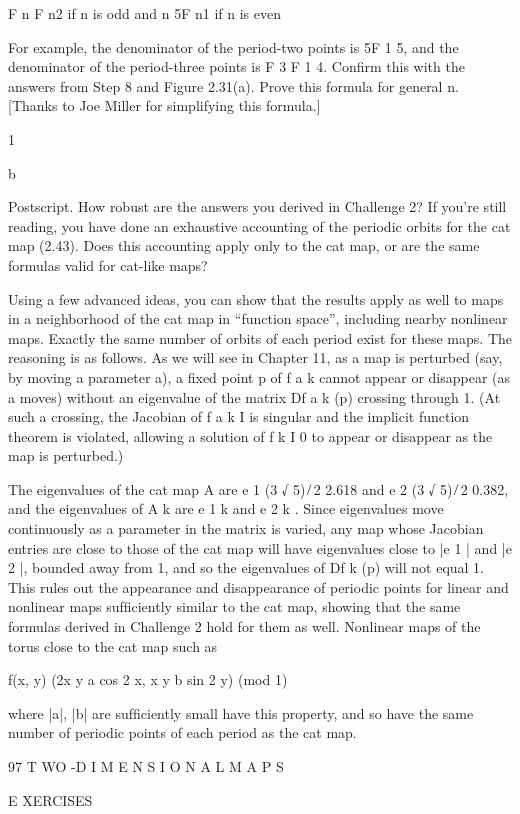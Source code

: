\documentclass[12pt]{article}
\begin{document}
F n  F n2 if n is odd and n 5F n1 if n is even { For example, the denominator of the period-two points is 5F 1  5, and the 
denominator of the period-three points is F 3  F 1  4. Conﬁrm this with the answers from Step 8 and Figure 2.31(a). Prove this 
formula for general n. [Thanks to Joe Miller for simplifying this formula.]

 1

b

Postscript. How robust are the answers you derived in Challenge 2? If you’re still reading, you have done an exhaustive accounting of 
the periodic orbits for the cat map (2.43). Does this accounting apply only to the cat map, or are the same formulas valid for 
cat-like maps?

Using a few advanced ideas, you can show that the results apply as well to maps in a neighborhood of the cat map in “function space”, 
including nearby nonlinear maps. Exactly the same number of orbits of each period exist for these maps. The reasoning is as follows. 
As we will see in Chapter 11, as a map is perturbed (say, by moving a parameter a), a ﬁxed point p of f a k cannot appear or 
disappear (as a moves) without an eigenvalue of the matrix Df a k (p) crossing through 1. (At such a crossing, the Jacobian of f a k  
I is singular and the implicit function theorem is violated, allowing a solution of f k  I  0 to appear or disappear as the map is 
perturbed.)

The eigenvalues of the cat map A are e 1  (3  √ 5) ̸ 2  2.618 and e 2  (3  √ 5) ̸ 2  0.382, and the eigenvalues of A k are e 1 k and 
e 2 k . Since eigenvalues move continuously as a parameter in the matrix is varied, any map whose Jacobian entries are close to those 
of the cat map will have eigenvalues close to |e 1 | and |e 2 |, bounded away from 1, and so the eigenvalues of Df k (p) will not 
equal 1. This rules out the appearance and disappearance of periodic points for linear and nonlinear maps sufﬁciently similar to the 
cat map, showing that the same formulas derived in Challenge 2 hold for them as well. Nonlinear maps of the torus close to the cat 
map such as

f(x, y)  (2x  y  a cos 2  x, x  y  b sin 2  y) (mod 1)

where |a|, |b| are sufﬁciently small have this property, and so have the same number of periodic points of each period as the cat 
map.

97 T WO -D I M E N S I O N A L M A P S

E XERCISES

}
\end{document}

